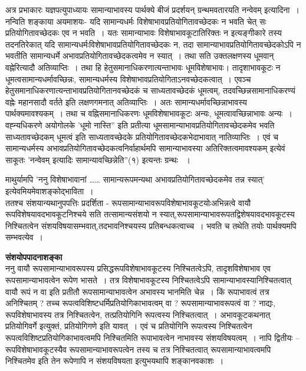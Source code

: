 {अत्र प्रभाकारः यज्ञपत्युपाध्यायः सामान्याभावस्य पार्थक्ये बीजं प्रदर्शयन् ग्रन्थमव\-तारयति नन्वेवम् इत्यादिना~। नन्विति शङ्काया अयमाशयः- यदि सामान्यधर्मः विशेषाभावप्रतियोगितावच्छेदकः न भवति चेत् सः प्रतियोगितावच्छेदकः एव न भवति~।  यतः सामान्याभावः \hbox{विशेषाभावकूटातिरिक्तः} न इत्यङ्गीकारे तस्य तदनतिरेकात् यदि सामान्यधर्मः\break विशेषाभावप्रतियोगितावच्छेदकः न, तदा सामान्याभावप्रतियोगितावच्छेदकोऽपि न भवतीति सामान्यधर्मे अभावप्रतियोगितावच्छेदकत्वमेव न स्यात्~। तथा सति उक्तलक्षणस्य \hbox{धूमवान्} वह्नेरित्यादौ अतिव्याप्तिः~। तथा हि हेतुसमानाधिकरणात्यन्ताभावः \hbox{धूमविशेषाभावः।} तादृशाभावकूटः न धूमत्वसामान्यधर्मावच्छिन्नः, सामान्यधर्मस्य विशेषाभावप्रतियोगिता\break ऽनवच्छेदकत्वात्~। एवञ्च हेतुसमानाधिकरणात्यन्ताभावप्रतियोगिता\-नवच्छेदकं च साध्यतावच्छेदकं धूमत्वम्, तदवच्छिन्नसामानाधिकरण्यं वह्नेः महानसादौ वर्तते इति लक्षणगमनात् अतिव्याप्तिः~। अतः सामान्यधर्मावच्छिन्नाभावस्य पार्थक्यमावश्य\-कम्~। तथा च वह्निसमानाधिकरणः धूमविशेषाभावकूटः अन्यः, धूमत्वावच्छिन्नाभावः अन्यः~। वह्न्यधिकरणे \hbox{अयोगोलके} ’धूमो नास्ति” इति प्रतीत्या धूमसामान्याभावप्रतियोगितावच्छेदकमेव भवति साध्यतावच्छेदकम् धूमत्वं इति साध्यतावच्छेदके प्रतियोगितावच्छेदकभेदाभावात् नातिव्याप्तिः~। एवं च सामान्यधर्मस्य अभावप्रतियोगितावच्छेदकत्वनिर्वाहार्थमपि सामान्याभावस्या अतिरिक्तत्वमावश्यकम् इत्येवं साकूतः ’नन्वेवम् इत्यादिः सामान्यावच्छिन्नेति”(१) इत्यन्तः ग्रन्थः  ~। 

माथुर्यामपि ’ननु विशेषाभावानां …… सामान्यरूपमन्यथा अभावप्रतियोगितावच्छेदकमेव तन्न स्यात्’ इत्येवमियमेवाशङ्कोद्भाविता~। 
~\\[0.1cm]
ततश्च संशयान्यथानुपपत्तिः प्रदर्शिता - रूपसामान्याभावरूपविशेषाभावकूटयोः\break अभिन्नत्वे वायौ रूपविशेषयावदभावकूटनिश्चये सति तत्सामान्यसंशयो न स्यात्,\break रूपसामान्या\-भावरूपतद्विशेषयावदभावकूटस्य निश्चितत्वेन संशयविषयासम्भवात्,\break तदभावनिश्चयस्य प्रतिबन्धकत्वाच्च~। भवति च तथेति तयोः पार्थक्यमपि सम्भवत्येव~। 

\textbf{संशयोपपादनाशङ्का}\\
ननु वायौ रूपसामान्याभावरूपस्य प्रसिद्धरूपविशेषाभावकूटस्य निश्चितत्वेऽपि, तादृशविशेषाभाव एव रूपसामान्याभावत्वेन रूपेण भासते~। तत्र विशेषाभावकूटस्य निश्चितत्वेऽपि सामान्याभावस्यानिश्चितत्वात् वायौ रूपं न वा इति प्रतीतौ रूपसामान्याभावत्वेन अभावस्य भानमिति चेन्न~। किं रूपाभावत्वं तत्र अनिश्चितम् ? तच्च रूपत्वविशिष्टधर्मिप्रतियोगिकाभावत्वम् वा ? रूपसामान्याभावरूपत्वं वा ? नाद्यः, रूपविशेषाभावस्य तत्र निश्चितत्वेन, तत्प्रतियोगिनि रूपत्वस्य निश्चितत्वात्~। अभावकूटकथनात् प्रतियोगिवर्गे इत्युक्तं, प्रतियोगिगणे इति यावत्~। एवं च प्रतियोगिनि रूपत्वस्य निश्चितत्वेन रूपत्वविशिष्टप्रतियोगिकाभावत्वमपि निश्चितमिति रूपाभावत्वेन नाभावस्य संशयविषयत्वम्~। नापि द्वितीयः – रूपविशेषाभावकूटस्यैव रूपसामान्याभावरूपत्वेन तस्य च तत्र निश्चितत्वात् रूपसामान्याभावत्वमपि निश्चितमेव इति तेन रूपेणापि न संशयविषयता इत्युभयथापि शङ्कानवकाशः~। 

}
